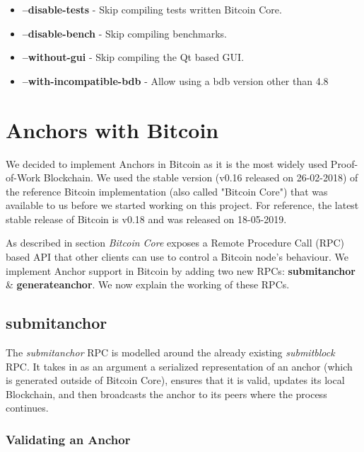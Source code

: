 \begin{itemize}
    \item \textbf{--disable-tests} - Skip compiling tests written Bitcoin Core.
    \item \textbf{--disable-bench} - Skip compiling benchmarks.
    \item \textbf{--without-gui} - Skip compiling the Qt based GUI.
    \item \textbf{--with-incompatible-bdb} - Allow using a bdb version other than 4.8
\end{itemize}


\newpage
\section{Anchors with Bitcoin} \label{impl-anchors}

We decided to implement Anchors in Bitcoin as it is the most widely used Proof-of-Work Blockchain. We used the stable version (v0.16 released on 26-02-2018) of the reference Bitcoin implementation (also called "Bitcoin Core") that was available to us before we started working on this project. For reference, the latest stable release of Bitcoin is v0.18 and was released on 18-05-2019. 

As described in section  \textit{Bitcoin Core} exposes a Remote Procedure Call (RPC) based API that other clients can use to control a Bitcoin node's behaviour. We implement Anchor support in Bitcoin by adding two new RPCs: \textbf{submitanchor} \& \textbf{generateanchor}. We now explain the working of these RPCs.


\subsection{submitanchor} \label{impl-submitanchor}

The \textit{submitanchor} RPC is modelled around the already existing \textit{submitblock} RPC. 
It takes in as an argument a serialized representation of an anchor (which is generated outside of Bitcoin Core), ensures that it is valid, updates its local Blockchain, and then broadcasts the anchor to its peers where the process continues.

\subsubsection{Validating an Anchor}

